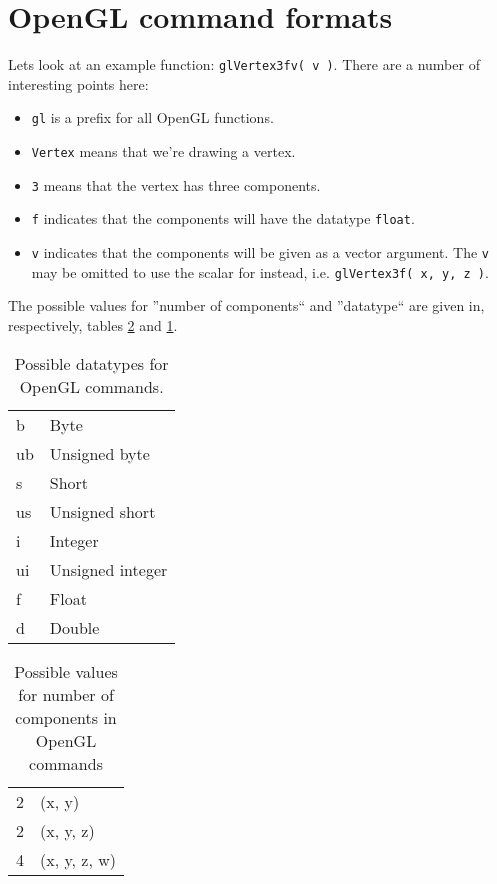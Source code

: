 \documentclass[a4paper, english, 12pt]{article}
\begin{document}


\section{OpenGL command formats}
\label{sec:command_formats}

Lets look at an example function: \texttt{glVertex3fv( v )}. There are a number of interesting points here:

\begin{itemize}
	\item \texttt{gl} is a prefix for all OpenGL functions.
	\item \texttt{Vertex} means that we're drawing a vertex.
	\item \texttt{3} means that the vertex has three components.
	\item \texttt{f} indicates that the components will have the datatype \texttt{float}.
	\item \texttt{v} indicates that the components will be given as a vector argument. The \texttt{v} may be omitted to use the scalar for instead, i.e. \texttt{glVertex3f( x, y, z )}. 
\end{itemize}

The possible values for ''number of components`` and ''datatype`` are given in, respectively, tables \ref{tab:number_of_components} and \ref{tab:data_types}.

\begin{table}
\label{tab:data_types}
\caption{Possible datatypes for OpenGL commands.}
\centering
\begin{tabular}{ll}
\toprule
	b	& Byte \\
	ub 	& Unsigned byte \\
	s 	& Short \\
	us 	& Unsigned short \\
	i 	& Integer\\
	ui 	& Unsigned integer\\
	f 	& Float\\
	d 	& Double \\
\bottomrule
\end{tabular}
\end{table}

\begin{table}
\label{tab:number_of_components}
\caption{Possible values for number of components in OpenGL commands}
\centering
\begin{tabular}{ll}
\toprule
	2	& (x, y) \\
	2 	& (x, y, z) \\
	4 	& (x, y, z, w) \\
\bottomrule
\end{tabular}
\end{table}
\end{document}
